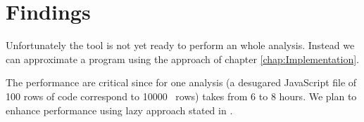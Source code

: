 \section{Findings}
\label{sec:Findings}
Unfortunately the tool is not yet ready to perform an whole analysis. Instead we can approximate a program using the approach of chapter \ref{chap:Implementation}.

The performance are critical since for one analysis (a desugared JavaScript file of 100 rows of code correspond to 10000 \ljs\ rows) takes from 6 to 8 hours. We plan to enhance performance using lazy approach stated in \cite{TAJS, TAJSDOM}.


